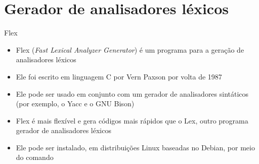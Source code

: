 \section{Gerador de analisadores léxicos}

\begin{frame}[fragile]{Flex}

    \begin{itemize}
        \item Flex (\textit{Fast Lexical Analyzer Generator}) é um programa para a geração de analisadores léxicos

        \item Ele foi escrito em linguagem C por Vern Paxson por volta de 1987

        \item Ele pode ser usado em conjunto com um gerador de analisadores sintáticos (por exemplo, o Yacc e o GNU Bison)

        \item Flex é mais flexível e gera códigos mais rápidos que o Lex, outro programa gerador de analisadores léxicos

        \item Ele pode ser instalado, em distribuições Linux baseadas no Debian, por meio do comando
    \end{itemize}

\end{frame}

